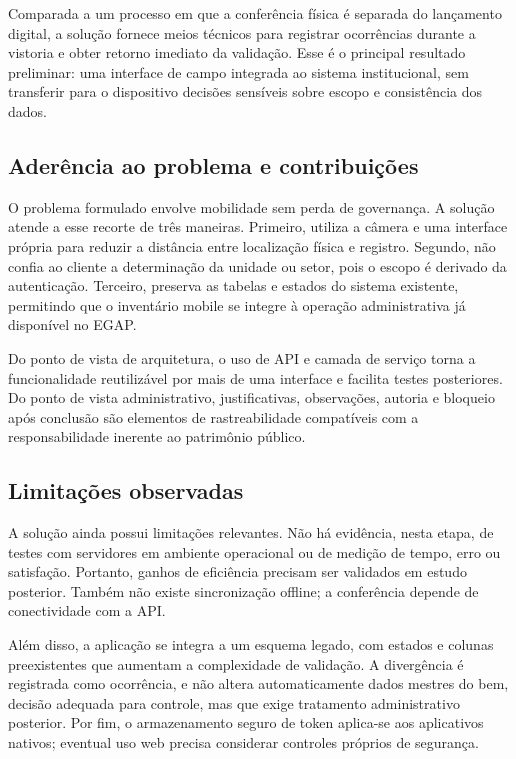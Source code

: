 \documentclass[12pt,a4paper]{article}
\begin{document}
Comparada a um processo em que a conferência física é separada do lançamento
digital, a solução fornece meios técnicos para registrar ocorrências durante a
vistoria e obter retorno imediato da validação. Esse é o principal resultado
preliminar: uma interface de campo integrada ao sistema institucional, sem
transferir para o dispositivo decisões sensíveis sobre escopo e consistência
dos dados.

\subsection{Aderência ao problema e contribuições}

O problema formulado envolve mobilidade sem perda de governança. A solução
atende a esse recorte de três maneiras. Primeiro, utiliza a câmera e uma
interface própria para reduzir a distância entre localização física e registro.
Segundo, não confia ao cliente a determinação da unidade ou setor, pois o
escopo é derivado da autenticação. Terceiro, preserva as tabelas e estados do
sistema existente, permitindo que o inventário mobile se integre à operação
administrativa já disponível no EGAP.

Do ponto de vista de arquitetura, o uso de API e camada de serviço torna a
funcionalidade reutilizável por mais de uma interface e facilita testes
posteriores. Do ponto de vista administrativo, justificativas, observações,
autoria e bloqueio após conclusão são elementos de rastreabilidade compatíveis
com a responsabilidade inerente ao patrimônio público.

\subsection{Limitações observadas}

A solução ainda possui limitações relevantes. Não há evidência, nesta etapa, de
testes com servidores em ambiente operacional ou de medição de tempo, erro ou
satisfação. Portanto, ganhos de eficiência precisam ser validados em estudo
posterior. Também não existe sincronização offline; a conferência depende de
conectividade com a API.

Além disso, a aplicação se integra a um esquema legado, com estados e colunas
preexistentes que aumentam a complexidade de validação. A divergência é
registrada como ocorrência, e não altera automaticamente dados mestres do bem,
decisão adequada para controle, mas que exige tratamento administrativo
posterior. Por fim, o armazenamento seguro de token aplica-se aos aplicativos
nativos; eventual uso web precisa considerar controles próprios de segurança.
\end{document}
